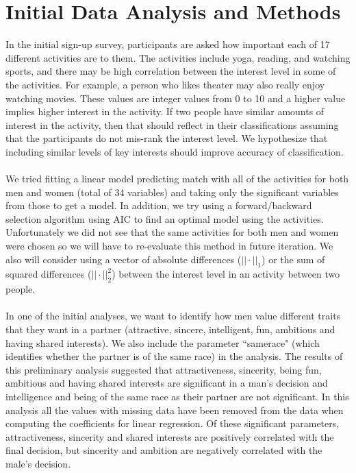 \documentclass{article}
\begin{document}
\section{Initial Data Analysis and Methods}
In the initial sign-up survey, participants are asked how important each of 17 different activities are to them.  The activities include yoga, reading, and watching sports, and there may be high correlation between the interest level in some of the activities.  For example, a person who likes theater may also really enjoy watching movies.  These values are integer values from 0 to 10 and a higher value implies higher interest in the activity.  If two people have similar amounts of interest in the activity, then that should reflect in their classifications assuming that the participants do not mis-rank the interest level. We hypothesize that including similar levels of key interests should improve accuracy of classification.\\  
\null\\
We tried fitting a linear model predicting match with all of the activities for both men and women (total of 34 variables) and taking only the significant variables from those to get a model.  In addition, we try using a forward/backward selection algorithm using AIC to find an optimal model using the activities.  Unfortunately we did not see that the same activities for both men and women were chosen so we will have to re-evaluate this method in future iteration.  We also will consider using a vector of absolute differences ($||\cdot||_1$) or the sum of squared differences ($||\cdot||_2^2$) between the interest level in an activity between two people. \\
\null\\
In one of the initial analyses, we want to identify how men value different traits that they want in a partner (attractive, sincere, intelligent, fun, ambitious and having shared interests). We also include the parameter ``samerace" (which identifies whether the partner is of the same race) in the analysis. The results of this preliminary analysis suggested that attractiveness, sincerity, being fun, ambitious and having shared interests are significant in a man's decision and intelligence and being of the same race as their partner are not significant.  In this analysis all the values with missing data have been removed from the data when computing the coefficients for linear regression. Of these significant parameters, attractiveness, sincerity and shared interests are positively correlated with the final decision, but sincerity and ambition are negatively correlated with the male's decision. \\
\end{document}

